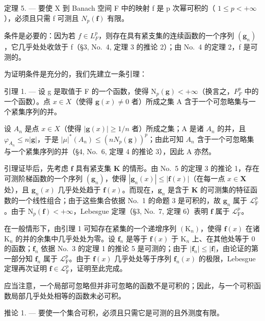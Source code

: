 定理 5. --- 要使 X 到 Banach 空间 F 中的映射 f 是 p 次幂可积的（ \(1 \leqslant p < +\infty\) ），必须且只需 f 可测且 \(N_{p}(\mathbf{f})\) 有限。

条件是必要的：因为若 \(f \in L_{F}^{p}\)，则存在具有紧支集的连续函数的一个序列 \((\mathbf{g}_{n})\)，它几乎处处收敛于 f（§3, No.~4, 定理 3 的推论 2）；由 No.~4 的定理 2，f 是可测的。

为证明条件是充分的，我们先建立一条引理：

引理 1. --- 设 g 是取值于 F 的一个函数，使得 \(\mathrm{N}_{p}(\mathbf{g}) < +\infty\)（换言之，\(F_{F}^{p}\) 中的一个函数）。点 \(x \in X\)（使得 \(\mathbf{g}(x) \neq 0\) 者）所成之集 A 含于一个可忽略集与一个紧集序列的并。

设 \(A_{n}\) 是点 \(x \in X\)（使得 \(|\mathbf{g}(x)| \geqslant 1/n\) 者）所成之集；A 是诸 \(A_{n}\) 的并，且 \(\varphi_{A_{n}} \leqslant n|\mathbf{g}|\)，于是 \(|\mu|^{*}(A_{n}) \leqslant (nN_{p}(\mathbf{g}))^{p}\)；由此可知 \(A_{n}\) 含于一个可忽略集与一个紧集序列的并（§4, No.~6, 定理 4 的推论 3），因此 A 亦然。

引理证毕后，先考虑 \(\mathbf{f}\) 具有紧支集 \(\mathbf{K}\) 的情形。由 No.~5 的定理 3 的推论 1，存在可测阶梯函数的一个序列 \((\mathbf{g}_n)\)，使得 \(|\mathbf{g}_n(x)| \leqslant |\mathbf{f}(x)|\)（在每一点 \(x \in \mathbf{X}\) 处），且 \(\mathbf{g}_n(x)\) 几乎处处趋于 \(\mathbf{f}(x)\)。而现在，\(\mathbf{g}_n\) 是含于 \(\mathbf{K}\) 的可测集的特征函数的一个线性组合；由于这些集合依据 No.~1 的命题 3 是可积的，故 \(\mathbf{g}_n\) 属于 \(\mathcal{L}_{\mathrm{F}}^p\)。由于 \(\mathrm{N}_p(\mathbf{f}) < +\infty\)，Lebesgue 定理（§3, No.~7, 定理 6）表明 \(\mathbf{f}\) 属于 \(\mathcal{L}_{\mathrm{F}}^p\)。

在一般情形下，由引理 1 可知存在紧集的一个递增序列 \((\mathrm{K}_n)\)，使得 \(\mathbf{f}(x)\) 在诸 \(\mathrm{K}_n\) 的并的余集中几乎处处为零。设 \(\mathbf{f}_n\) 是等于 \(\mathbf{f}(x)\) 于 \(\mathrm{K}_n\) 上、在其他处等于 0 的函数；\(\mathbf{f}_n\) 依据 No.~3 的定理 1 的推论 5 是可测的；由于 \(|\mathbf{f}_n| \leqslant |\mathbf{f}|\)，由论证的第一部分知 \(\mathbf{f}_n\) 属于 \(\mathcal{L}_{\mathrm{F}}^p\)。由于 \(\mathbf{f}(x)\) 几乎处处等于序列 \(\mathbf{f}_n(x)\) 的极限，Lebesgue 定理再次证明 \(\mathbf{f} \in \mathcal{L}_{\mathrm{F}}^p\)，证明至此完成。

应当注意，一个局部可忽略但并非可忽略的函数不是可积的；因此，与一个可积函数局部几乎处处相等的函数未必可积。

推论 1. --- 要使一个集合可积，必须且只需它是可测的且外测度有限。

